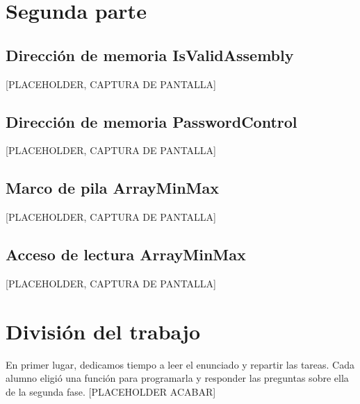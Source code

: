 \documentclass[11pt,a4paper]{article}
\begin{document}
\newpage
\section{Segunda parte}
\subsection{Dirección de memoria IsValidAssembly}
[PLACEHOLDER, CAPTURA DE PANTALLA]

\subsection{Dirección de memoria PasswordControl}
[PLACEHOLDER, CAPTURA DE PANTALLA]

\subsection{Marco de pila ArrayMinMax}
[PLACEHOLDER, CAPTURA DE PANTALLA]

\subsection{Acceso de lectura ArrayMinMax}
[PLACEHOLDER, CAPTURA DE PANTALLA]

\newpage

\section{División del trabajo}
\hspace{1mm} En primer lugar, dedicamos tiempo a leer el enunciado y repartir las tareas.
Cada alumno eligió una función para programarla y responder las preguntas sobre ella
de la segunda fase.
[PLACEHOLDER ACABAR]
\end{document}
